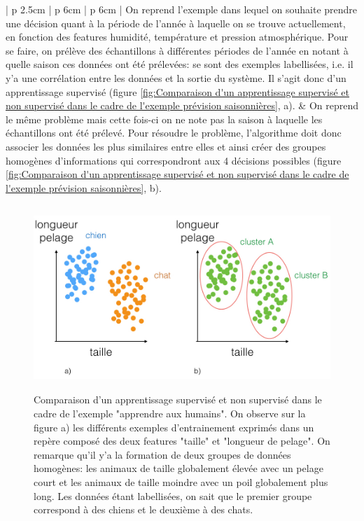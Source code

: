 \begin{table}[h]
\begin{tabular}{ | p {2.5cm} | p {6cm} | p {6cm} |}
	 On reprend l'exemple dans lequel on souhaite prendre une décision quant à la période de l'année à laquelle on se trouve actuellement, en fonction des features humidité, température et pression atmosphérique. Pour se faire, on prélève des échantillons à différentes périodes de l'année en notant à quelle saison ces données ont été prélevées: se sont des exemples labellisées, i.e. il y'a une corrélation entre les données et la sortie du système. Il s'agit donc d'un apprentissage supervisé (figure \ref{fig:Comparaison d'un apprentissage supervisé et non supervisé dans le cadre de l'exemple prévision saisonnières}, a). &
	On reprend le même problème mais cette fois-ci on ne note pas la saison à laquelle les échantillons ont été prélevé. Pour résoudre le problème, l'algorithme doit donc associer les données les plus similaires entre elles et ainsi créer des groupes homogènes d'informations qui correspondront aux 4 décisions possibles (figure \ref{fig:Comparaison d'un apprentissage supervisé et non supervisé dans le cadre de l'exemple prévision saisonnières}, b). \\
	\hline
	\end{tabular}
	\caption[Comparaison des différents modèles d'apprentissage]{Comparaison de l'apprentissage supervisé et non supervisé par des exemples}
	\label {tab: Comparaison des différentes méthodes d'apprentissage}
\end{table}

\begin{figure}[h]
	\centering\includegraphics[height=7cm]{images/apprentissage_chat.jpeg}
	\caption[Comparaison d'un apprentissage supervisé et non supervisé dans le cadre de l'exemple "apprendre aux humains"]{Comparaison d'un apprentissage supervisé et non supervisé dans le cadre de l'exemple "apprendre aux humains". On observe sur la figure a) les différents exemples d'entrainement exprimés dans un repère composé des deux features "taille" et "longueur de pelage". On remarque qu'il y'a la formation de deux groupes de données homogènes: les animaux de taille globalement élevée avec un pelage court et les animaux de taille moindre avec un poil globalement plus long. Les données étant labellisées, on sait que le premier groupe correspond à des chiens et le deuxième à des chats.}
	\label{fig:Comparaison d'un apprentissage supervisé et non supervisé dans le cadre de l'exemple "apprendre aux humains"}
\end{figure}

